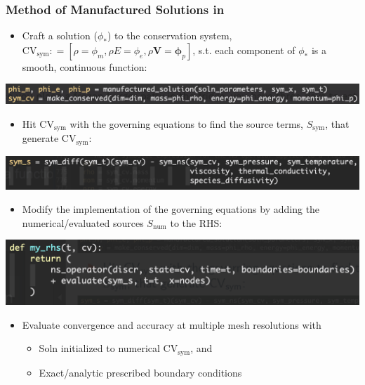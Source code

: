 \begin{frame}\frametitle{Method of Manufactured Solutions in \mirgecom{}}
\begin{itemize}
\item Craft a solution ($\phi_{*}$) to the conservation system, $\text{CV}_\text{sym}: = \left[\rho=\phi_m, \rho{E}=\phi_e, \rho\mathbf{V}=\mathbf{\phi}_p\right]$, s.t. each component of $\phi_{*}$ is a smooth, continuous function:
\end{itemize}
\includegraphics[width=.8\textwidth]{figures/CreateSymbolicSolution.png}
\begin{itemize}
\item Hit $\text{CV}_\text{sym}$ with the governing equations to find the source terms, $S_\text{sym}$, that generate $\text{CV}_\text{sym}$:
\end{itemize}
\includegraphics[width=.8\textwidth]{figures/CalculateSymbolicSources.png}
\begin{itemize}
\item Modify the implementation of the governing equations by adding the numerical/evaluated sources $S_\text{num}$ to the RHS:
\end{itemize}
\includegraphics[width=.8\textwidth]{figures/NumRHS.png}
\begin{itemize}
\item Evaluate convergence and accuracy at multiple mesh resolutions with
      \begin{itemize}
      \item Soln initialized to numerical $\text{CV}_\text{sym}$, and
      \item Exact/analytic prescribed boundary conditions
      \end{itemize}
\end{itemize}
\end{frame}

